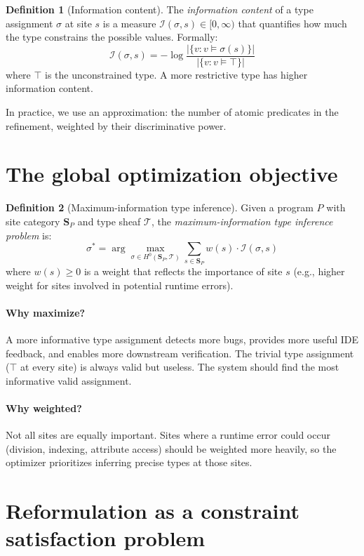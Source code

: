 \documentclass[11pt]{report}
\theoremstyle{definition}
\newtheorem{definition}{Definition}[section]
\theoremstyle{plain}
\begin{document}
\begin{definition}[Information content]
The \emph{information content} of a type assignment $\sigma$ at site $s$ is
a measure $\mathcal{I}(\sigma, s) \in [0, \infty)$ that quantifies how much
the type constrains the possible values. Formally:
\[
  \mathcal{I}(\sigma, s) = -\log \frac{|\{v : v \models \sigma(s)\}|}
    {|\{v : v \models \top\}|}
\]
where $\top$ is the unconstrained type. A more restrictive type has higher
information content.
\end{definition}

In practice, we use an approximation: the number of atomic predicates in the
refinement, weighted by their discriminative power.

\section{The global optimization objective}

\begin{definition}[Maximum-information type inference]
Given a program $P$ with site category $\mathbf{S}_P$ and type sheaf
$\mathcal{T}$, the \emph{maximum-information type inference problem} is:
\[
  \sigma^* = \arg\max_{\sigma \in H^0(\mathbf{S}_P, \mathcal{T})}
    \sum_{s \in \mathbf{S}_P} w(s) \cdot \mathcal{I}(\sigma, s)
\]
where $w(s) \geq 0$ is a weight that reflects the importance of site $s$
(e.g., higher weight for sites involved in potential runtime errors).
\end{definition}

\paragraph{Why maximize?}
A more informative type assignment detects more bugs, provides more useful
IDE feedback, and enables more downstream verification. The trivial type
assignment ($\top$ at every site) is always valid but useless. The system
should find the most informative valid assignment.

\paragraph{Why weighted?}
Not all sites are equally important. Sites where a runtime error could occur
(division, indexing, attribute access) should be weighted more heavily, so the
optimizer prioritizes inferring precise types at those sites.

\section{Reformulation as a constraint satisfaction problem}
\end{document}
